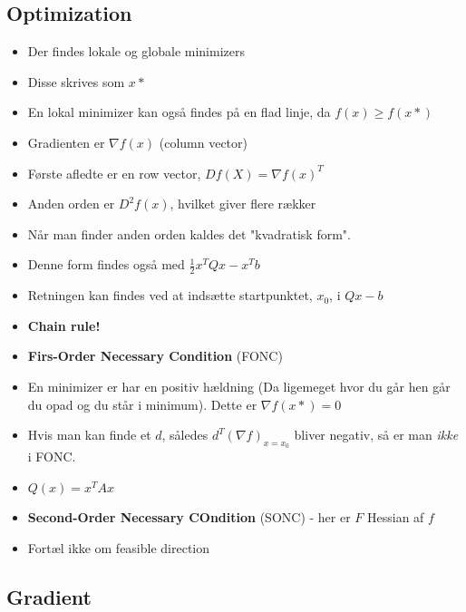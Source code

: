 \documentclass[danish, 10pt]{Memoir}
\begin{document}
\subsection{Optimization} %
\label{sub:calculus}
\begin{itemize}
	\item Der findes lokale og globale minimizers
	\item Disse skrives som $x*$
	\item En lokal minimizer kan også findes på en flad linje, da $f(x) \geq f(x*)$
	\item Gradienten er $\nabla f(x)$ (column vector)
	\item Første afledte er en row vector, $Df(X) = \nabla f(x)^T$
	\item Anden orden er $D^2f(x)$, hvilket giver flere rækker
	\item Når man finder anden orden kaldes det "kvadratisk form".
	\item[] Denne form findes også med $\frac{1}{2}x^T Qx - x^T b$
	\item Retningen kan findes ved at indsætte startpunktet, $x_0$, i $Qx-b$
	\item \textbf{Chain rule!}
	\item \textbf{Firs-Order Necessary Condition} (FONC)
	\item[] En minimizer er har en positiv hældning (Da ligemeget hvor du går hen går du opad og du står i minimum). Dette er $\nabla f(x*)=0$
	\item Hvis man kan finde et $d$, således $d^T(\nabla f)_ {x=x_0}$ bliver negativ, så er man \emph{ikke} i FONC.
	\item $Q(x) = x^T A x$
	\item \textbf{Second-Order Necessary COndition} (SONC) - her er $F$ Hessian af $f$
	\item Fortæl ikke om feasible direction

\end{itemize}


\subsection{Gradient} %
\label{sub:gradient}
\end{document}
